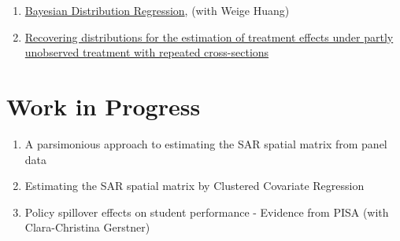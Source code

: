 \documentclass[12pt,letterpaper]{article}
\begin{document}
\begin{enumerate}
	
	\item \href{https://papers.ssrn.com/sol3/papers.cfm?abstract_id=3048658}{Bayesian Distribution Regression}, (with Weige Huang)
	
	
	\item \href{https://papers.ssrn.com/sol3/papers.cfm?abstract_id=3194286}{Recovering distributions for the estimation of treatment
		effects under partly unobserved treatment with repeated
		cross-sections}
	
	
\end{enumerate}

\section*{Work in Progress}
\begin{enumerate}
	\item A parsimonious approach to estimating the SAR spatial matrix from panel data
	\item Estimating the SAR spatial matrix by Clustered Covariate Regression
	\item Policy spillover effects on student performance - Evidence from PISA (with Clara-Christina Gerstner)
\end{enumerate}
\end{document}

